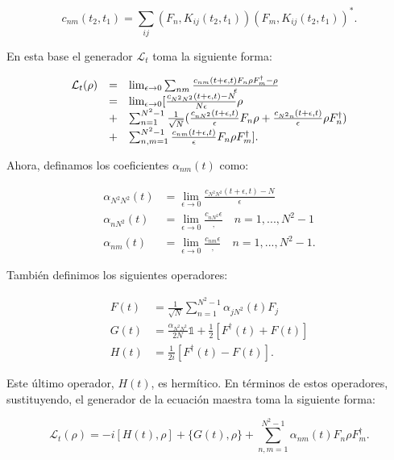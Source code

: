 \begin{equation}
    c_{nm}(t_2, t_1) = \sum_{ij} (F_n, K_{ij}(t_2, t_1)) (F_m, K_{ij}(t_2, t_1))^* .
\end{equation}

En esta base el generador $\mathcal{L}_t$ toma la siguiente forma:

\begin{equation}
    \begin{array}{r c l}
        \mathcal{L}_t(\rho)
        &=& \lim_{\epsilon \to 0} \sum_{nm} \frac{c_{nm}(t+\epsilon,t) F_n \rho F_m^\dagger - \rho}{\epsilon} \\
        &=& \lim_{\epsilon \to 0}
        [\frac{c_{N^2N^2}(t+\epsilon,t) - N}{N\epsilon} \rho \\
        &+& \sum_{n=1}^{N^2-1} \frac{1}{\sqrt{N}} (
        \frac{c_{nN^2}(t+\epsilon,t)}{\epsilon} F_n \rho +
        \frac{c_{N^2n}(t+\epsilon,t)}{\epsilon} \rho F_n^\dagger) \\
        &+& \sum_{n,m=1}^{N^2-1} \frac{c_{nm}(t+\epsilon,t)}{\epsilon} F_n \rho F_m^\dagger] .
    \end{array}
\end{equation}

Ahora, definamos los coeficientes $\alpha_{nm}(t)$ como:

\begin{align}
    \alpha_{N^2N^2}(t) &= \lim_{\epsilon \to 0} \frac{c_{N^2N^2}(t+\epsilon,t) - N}{\epsilon} \\
    \alpha_{nN^2}(t) &= \lim_{\epsilon \to 0} \frac{c_{nN^2}{\epsilon}}, \quad n = 1, ... , N^2 -1 \\
    \alpha_{nm}(t) &= \lim_{\epsilon \to 0} \frac{c_{nm}{\epsilon}}, \quad n = 1, ... , N^2 -1 .
\end{align}

También definimos los siguientes operadores:

\begin{align}
    F(t) &= \frac{1}{\sqrt{N}} \sum_{n=1}^{N^2-1} \alpha_{jN^2}(t) F_j \\
    G(t) &= \frac{\alpha_{N^2N^2}}{2N} \mathds{1} + \frac{1}{2} [F^\dagger(t) + F(t)] \\
    H(t) &= \frac{1}{2i} [F^\dagger(t) - F(t)] .
\end{align}

Este último operador, $H(t)$, es hermítico. En términos de estos operadores, sustituyendo, el generador de la ecuación maestra toma la siguiente forma:

\begin{equation}
    \mathcal{L}_t(\rho) = -i [H(t), \rho] + \{G(t), \rho\} + \sum_{n,m=1}^{N^2-1} \alpha_{nm}(t) F_n \rho F_m^\dagger .
\end{equation}

